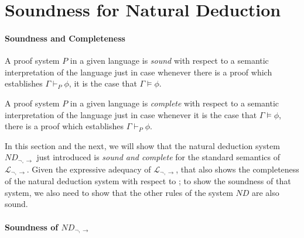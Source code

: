 


\section{Soundness for Natural Deduction}
\paragraph{Soundness and Completeness}

A proof system $P$ in a given language is \emph{sound} with respect to a semantic interpretation of the language just in case whenever there is a proof which establishes $\Gamma \vdash_{P} \phi$, it is the case that $\Gamma \vDash \phi$.

A proof system $P$ in a given language is \emph{complete} with respect to a semantic interpretation of the language just in case whenever it is the case that $\Gamma \vDash \phi$, there is a proof which establishes $\Gamma \vdash_{P} \phi$.

In this section and the next, we will show that the natural deduction system $ND_{\neg,\to}$ just introduced is \emph{sound and complete} for the standard semantics of $\mathcal{L}_{\neg,\to}$. Given the expressive adequacy of $\mathcal{L}_{\neg,\to}$, that also shows the completeness of the natural deduction system with respect to \lone; to show the soundness of that system, we also need to show that the other rules of the system $ND$ are also sound.


\paragraph{Soundness of $ND_{\neg,\to}$}

